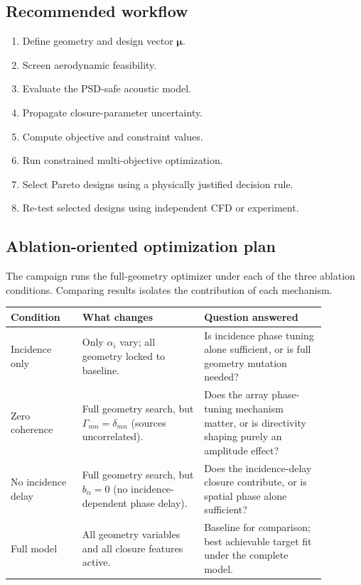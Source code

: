 \documentclass[11pt]{article}
\newcommand{\vect}[1]{\bm{#1}}
\begin{document}
\subsection{Recommended workflow}

\begin{enumerate}
    \item Define geometry and design vector $\vect{\mu}$.
    \item Screen aerodynamic feasibility.
    \item Evaluate the PSD-safe acoustic model.
    \item Propagate closure-parameter uncertainty.
    \item Compute objective and constraint values.
    \item Run constrained multi-objective optimization.
    \item Select Pareto designs using a physically justified decision rule.
    \item Re-test selected designs using independent CFD or experiment.
\end{enumerate}

\subsection{Ablation-oriented optimization plan}

The campaign runs the full-geometry optimizer under each of the three ablation
conditions.  Comparing results isolates the contribution of each mechanism.

\begin{longtable}{p{0.20\linewidth} p{0.34\linewidth} p{0.34\linewidth}}
\toprule
\textbf{Condition} & \textbf{What changes} & \textbf{Question answered} \\
\midrule
\endhead

Incidence only
&
Only $\alpha_i$ vary; all geometry locked to baseline.
&
Is incidence phase tuning alone sufficient, or is full geometry mutation needed?
\\

Zero coherence
&
Full geometry search, but $\Gamma_{mn}=\delta_{mn}$ (sources uncorrelated).
&
Does the array phase-tuning mechanism matter, or is directivity shaping purely an amplitude effect?
\\

No incidence delay
&
Full geometry search, but $b_\alpha=0$ (no incidence-dependent phase delay).
&
Does the incidence-delay closure contribute, or is spatial phase alone sufficient?
\\

Full model
&
All geometry variables and all closure features active.
&
Baseline for comparison; best achievable target fit under the complete model.
\\

\bottomrule
\end{longtable}
\end{document}
